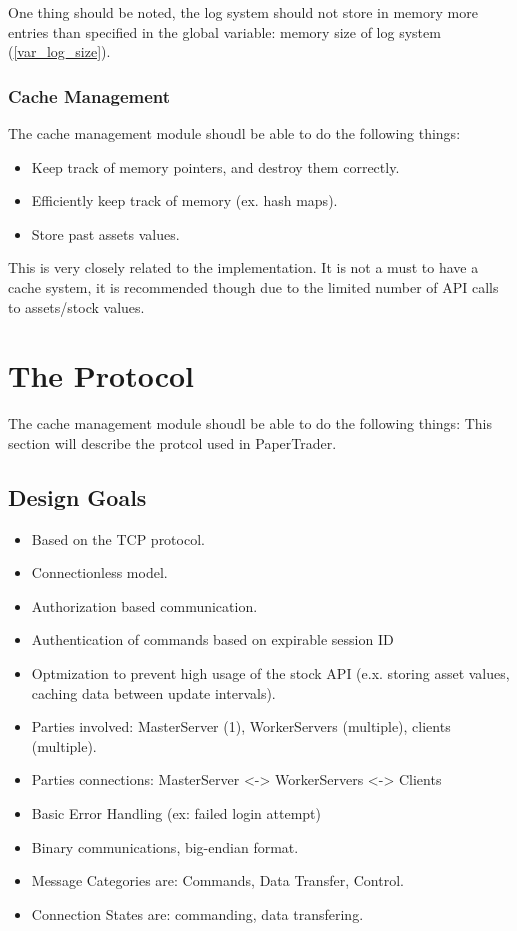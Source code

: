 \documentclass[a4paper]{article}
\begin{document}
One thing should be noted, the log system should not store in memory more 
entries than specified in the global variable: memory size of log system
(\ref{var_log_size}).

\subsubsection{Cache Management}
\label{worker_mods_cache}
The cache management module shoudl be able to do the following things:
\begin{itemize}
	\item Keep track of memory pointers, and destroy them correctly.
	\item Efficiently keep track of memory (ex. hash maps).
	\item Store past assets values.
\end{itemize}

This is very closely related to the implementation. It is not a must to have a
cache system, it is recommended though due to the limited number of API calls
to assets/stock values.

\section{The Protocol}
\label{protocol}
The cache management module shoudl be able to do the following things:
This section will describe the protcol used in PaperTrader.

\subsection{Design Goals}
\label{protocol_goals}
\begin{itemize}
	\item Based on the TCP protocol.
	\item Connectionless model.
	\item Authorization based communication.
	\item Authentication of commands based on expirable session ID
	\item Optmization to prevent high usage of the stock API (e.x. storing
		asset values, caching data between update intervals).
	\item Parties involved: MasterServer (1), WorkerServers (multiple), clients
		(multiple). 
	\item Parties connections: MasterServer <-> WorkerServers <-> Clients
	\item Basic Error Handling (ex: failed login attempt)
	\item Binary communications, big-endian format.
	\item Message Categories are: Commands, Data Transfer, Control.
	\item Connection States are: commanding, data transfering.
\end{itemize}
\end{document}

